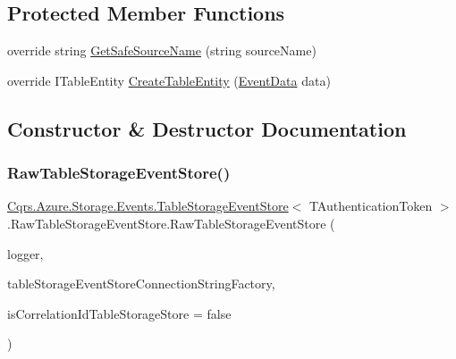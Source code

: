 \subsection*{Protected Member Functions}
\begin{DoxyCompactItemize}
\item 
override string \hyperlink{classCqrs_1_1Azure_1_1Storage_1_1Events_1_1TableStorageEventStore_1_1RawTableStorageEventStore_ad7534d979a3f13221c237f3da3cafafb}{Get\+Safe\+Source\+Name} (string source\+Name)
\item 
override I\+Table\+Entity \hyperlink{classCqrs_1_1Azure_1_1Storage_1_1Events_1_1TableStorageEventStore_1_1RawTableStorageEventStore_ae285669c3a810c79b4f50382209e6843}{Create\+Table\+Entity} (\hyperlink{classCqrs_1_1Events_1_1EventData}{Event\+Data} data)
\end{DoxyCompactItemize}


\subsection{Constructor \& Destructor Documentation}
\mbox{\label{classCqrs_1_1Azure_1_1Storage_1_1Events_1_1TableStorageEventStore_1_1RawTableStorageEventStore_ad82ce92dd98e683b11b2bdc0b8d5bebc}} 
\subsubsection{\texorpdfstring{Raw\+Table\+Storage\+Event\+Store()}{RawTableStorageEventStore()}}
{\footnotesize\ttfamily \hyperlink{classCqrs_1_1Azure_1_1Storage_1_1Events_1_1TableStorageEventStore}{Cqrs.\+Azure.\+Storage.\+Events.\+Table\+Storage\+Event\+Store}$<$ T\+Authentication\+Token $>$.Raw\+Table\+Storage\+Event\+Store.\+Raw\+Table\+Storage\+Event\+Store (\begin{DoxyParamCaption}\item[{I\+Logger}]{logger,  }\item[{\hyperlink{interfaceCqrs_1_1Azure_1_1BlobStorage_1_1ITableStorageStoreConnectionStringFactory}{I\+Table\+Storage\+Store\+Connection\+String\+Factory}}]{table\+Storage\+Event\+Store\+Connection\+String\+Factory,  }\item[{bool}]{is\+Correlation\+Id\+Table\+Storage\+Store = {\ttfamily false} }\end{DoxyParamCaption})}



